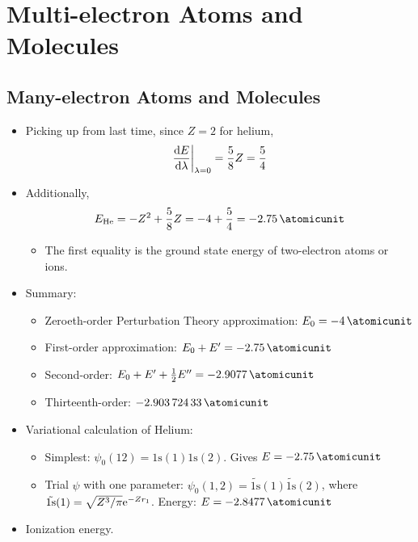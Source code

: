 \documentclass[../notes.tex]{subfiles}
\begin{document}
\chapter{Multi-electron Atoms and Molecules}
\section{Many-electron Atoms and Molecules}
\begin{itemize}
    \item {}Picking up from last time, since $Z=2$ for helium,
    \begin{equation*}
        \dv{E}{\lambda}\bigg|_{\lambda=0} = \frac{5}{8}Z = \frac{5}{4}
    \end{equation*}
    \item Additionally,
    \begin{equation*}
        E_{\ce{He}} = -Z^2+\frac{5}{8}Z = -4+\frac{5}{4} = \SI{-2.75}{\atomicunit}
    \end{equation*}
    \begin{itemize}
        \item The first equality is the ground state energy of two-electron atoms or ions.
    \end{itemize}
    \item Summary:
    \begin{itemize}
        \item Zeroeth-order Perturbation Theory approximation: $E_0=\SI{-4}{\atomicunit}$
        \item First-order approximation: $E_0+E'=\SI{-2.75}{\atomicunit}$
        \item Second-order: $E_0+E'+\frac{1}{2}E''=\SI{-2.9077}{\atomicunit}$
        \item Thirteenth-order: $\SI{-2.90372433}{\atomicunit}$
    \end{itemize}
    \item Variational calculation of Helium:
    \begin{itemize}
        \item Simplest: $\psi_0(12)=\text{1s}(1)\text{1s}(2)$. Gives $E=\SI{-2.75}{\atomicunit}$
        \item Trial $\psi$ with one parameter: $\psi_0(1,2)=\tilde{\text{1s}}(1)\tilde{\text{1s}}(2)$, where $\tilde{\text{1s}}(1)=\sqrt{Z^3/\pi}\e[-Zr_1]$. Energy: $E=\SI{-2.8477}{\atomicunit}$
    \end{itemize}
    \item Ionization energy.
    \begin{itemize}

\end{itemize}
\end{itemize}
\end{document}
